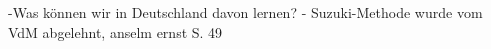 









-Was können wir in Deutschland davon lernen? - Suzuki-Methode wurde vom VdM
abgelehnt, anselm ernst S. 49


